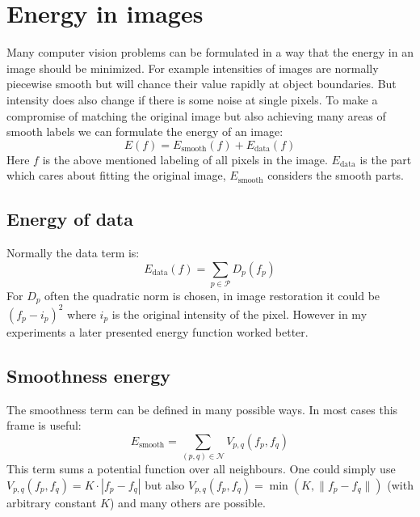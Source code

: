 \documentclass[runningheads,a4paper]{llncs}
\begin{document}
\section{Energy in images}
    Many computer vision problems can be formulated in a way that the energy in an image should be minimized. For example intensities of images are normally piecewise smooth but will chance their value
    rapidly at object boundaries. But intensity does also change if there is some noise at single pixels. To make a compromise of matching the original image but also achieving many areas of smooth 
    labels we can formulate the energy of an image:
    \begin{equation}
        E(f) = E_\text{smooth}(f) + E_\text{data}(f)
        \label{eq:ene}
    \end{equation}
    Here $f$ is the above mentioned labeling of all pixels in the image.
    $E_\text{data}$ is the part which cares about fitting the original image, $E_\text{smooth}$ considers the smooth parts.
   
    \subsection{Energy of data}
        Normally the data term is:
        \begin{equation}
            E_\text{data}(f) = \sum_{p \in \mathcal{P}} D_p(f_p)
        \end{equation}
        For $D_p$ often the quadratic norm is chosen, in image restoration it could be \\$(f_p -i_p)^2$ where $i_p$ is the original intensity of the pixel. However in my experiments a later presented energy function worked better.

    \subsection{Smoothness energy}
        The smoothness term can be defined in many possible ways. In most cases this frame is useful:
        \begin{equation}
            E_\text{smooth} = \sum_{ (p,q) \in \mathcal{N}} V_{p,q}(f_p, f_q)
        \end{equation}
        This term sums a potential function over all neighbours. 
        One could simply use $V_{p,q}(f_p, f_q) = K\cdot|f_p-f_q|$ but also $V_{p,q}(f_p,f_q) = \min(K, \lVert f_p-f_q \rVert)$ (with arbitrary constant $K$) and many others are possible. 
        
\end{document}
